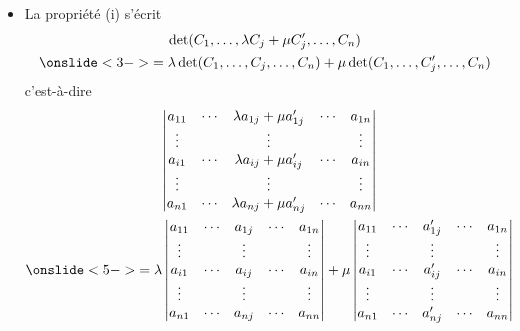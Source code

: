 
\begin{frame}
\begin{itemize}
  \item  La propriété (i) s'écrit \pause
\begin{gather*} 
 \det (C_1,\ldots,\lambda C_j + \mu C'_j,\ldots, C_n) \\
\onslide<3->{= \lambda  \det (C_1,\ldots,C_j,\ldots, C_n)+ \mu \det (C_1,\ldots,C_j',\ldots, C_n)} 
\end{gather*}
 c'est-à-dire
\begin{gather*}
\begin{vmatrix}
a_{11} & \cdots & \lambda a_{1j}+\mu a_{1j}' & \cdots & a_{1n} \\
\vdots &        &       \vdots                &        & \vdots\\
a_{i1} & \cdots & \lambda a_{ij}+\mu a_{ij}' & \cdots & a_{in} \\
\vdots &        &       \vdots                &        & \vdots\\
a_{n1} & \cdots & \lambda a_{nj}+\mu a_{nj}' & \cdots & a_{nn} \\
\end{vmatrix} \\
\onslide<5->{ =
\lambda \begin{vmatrix}
a_{11} & \cdots &  a_{1j} & \cdots & a_{1n} \\
\vdots &        &       \vdots                &        & \vdots\\
a_{i1} & \cdots & a_{ij} & \cdots & a_{in} \\
\vdots &        &       \vdots                &        & \vdots\\
a_{n1} & \cdots & a_{nj} & \cdots & a_{nn} \\
\end{vmatrix} 
 +
\mu \begin{vmatrix}
a_{11} & \cdots & a_{1j}' & \cdots & a_{1n} \\
\vdots &        &       \vdots                &        & \vdots\\
a_{i1} & \cdots & a_{ij}' & \cdots & a_{in} \\
\vdots &        &       \vdots                &        & \vdots\\
a_{n1} & \cdots & a_{nj}' & \cdots & a_{nn} \\
\end{vmatrix}}
\end{gather*}

\end{itemize}
\pause\pause\pause
\end{frame}

